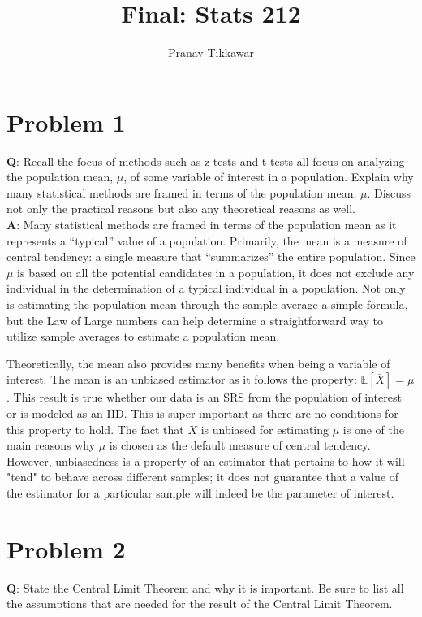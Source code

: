\documentclass{article}
\author{Pranav Tikkawar}
\title{Final: Stats 212}
\begin{document}
\maketitle

\section*{Problem 1}
\textbf{Q}: Recall the focus of methods such as z-tests and t-tests all focus on analyzing the population mean, $\mu$, of some variable of interest in a population. Explain why many statistical methods are framed in terms of the population mean, $\mu$. Discuss not only the practical reasons but also any theoretical reasons as well.\\

\textbf{A}: Many statistical methods are framed in terms of the population mean as it represents a “typical” value of a population. Primarily, the mean is a measure of central tendency: a single measure that “summarizes” the entire population. Since $\mu$ is based on all the potential candidates in a population, it does not exclude any individual in the determination of a typical individual in a population. Not only is estimating the population mean through the sample average a simple formula, but the Law of Large numbers can help determine a straightforward way to utilize sample averages to estimate a population mean.

Theoretically, the mean also provides many benefits when being a variable of interest. The mean is an unbiased estimator as it follows the property: $\mathbb{E}\left[\bar{X}\right]=\mu$. This result is true whether our data is an SRS from the population of interest or is modeled as an IID. This is super important as there are no conditions for this property to hold. The fact that $\bar{X}$ is unbiased for estimating $\mu$ is one of the main reasons why $\mu$ is chosen as the default measure of central tendency. However, unbiasedness is a property of an estimator that pertains to how it will "tend" to behave across different samples; it does not guarantee that a value of the estimator for a particular sample will indeed be the parameter of interest.
	
\section*{Problem 2}
\textbf{Q}: State the Central Limit Theorem and why it is important. Be sure to list all the assumptions that are needed for the result of the Central Limit Theorem. \\
\end{document}

